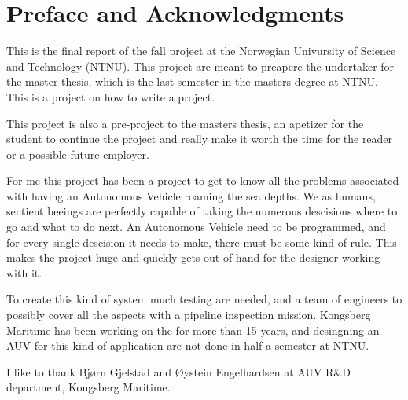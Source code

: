 \chapter{Preface and Acknowledgments}
	This is the final report of the fall project at the Norwegian Univursity of Science and Technology
	(NTNU). This project are meant to preapere the
	undertaker for the master thesis, which is the last semester in the masters degree at NTNU.
	This is a project on how to write a project. 

	This project is also a pre-project to the masters thesis, an apetizer for the student to continue the
	project and really make it worth the time for the reader or a possible future employer. 
	
	For me this project has been a project to get to know all the problems associated with having an 
	Autonomous Vehicle roaming the sea depths. We as humans, sentient beeings are perfectly capable 
	of taking the numerous descisions where
	to go and what to do next. An Autonomous Vehicle need to be programmed, and for every single
	descision it needs to make, there must be some kind of rule. This makes the project huge and quickly gets 
	out of hand for the designer working with it. 

	To create this kind of system much testing are needed, and a team of engineers to possibly cover all
	the aspects with a pipeline inspection mission. Kongsberg Maritime has been working on the \hugin for
	more than 15 years, and desingning an AUV for this kind of application are not done in half a semester
	at NTNU. 
	
	I like to thank Bjørn Gjelstad and Øystein Engelhardsen at AUV R\&D department, Kongsberg Maritime.



